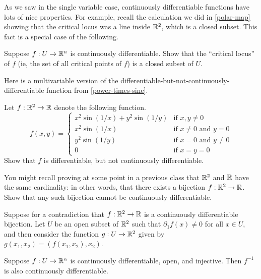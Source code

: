 As we saw in the single variable case, continuously differentiable functions have lots of nice properties. For example, recall the calculation we did in \cref{polar-map} showing that the critical locus was a line inside $\mathbb{R}^2$, which is a closed subset. This fact is a special case of the following.

\begin{exercise} \label{critical-locus-closed}
	Suppose $f : U \to \mathbb{R}^n$ is continuously differentiable. Show that the ``critical locus'' of $f$ (ie, the set of all critical points of $f$) is a closed subset of $U$.
\end{exercise}

Here is a multivariable version of the differentiable-but-not-continuously-differentiable function from \cref{power-times-sine}. 

\begin{exercise}
	Let $f : \mathbb{R}^2 \to \mathbb{R}$ denote the following function.
	\[ f(x, y) = \begin{cases} x^2\sin(1/x) + y^2\sin(1/y) & \text{if } x, y \neq 0 \\
	x^2\sin(1/x) & \text{if } x \neq 0 \text{ and } y = 0 \\
	y^2\sin(1/y) & \text{if } x = 0 \text{ and } y \neq 0 \\
	0 & \text{if } x = y = 0 \end{cases} \]
	Show that $f$ is differentiable, but not continuously differentiable. 
\end{exercise}

\begin{exercise} \label{no-continously-differentiable-bijection}
	You might recall proving at some point in a previous class that $\mathbb{R}^2$ and $\mathbb{R}$ have the same cardinality: in other words, that there exists a bijection $f : \mathbb{R}^2 \to \mathbb{R}$. Show that any such bijection cannot be continuously differentiable. 
	
	\begin{hint}
		Suppose for a contradiction that $f : \mathbb{R}^2 \to \mathbb{R}$ is a continuously differentiable bijection.  Let $U$ be an open subset of $\mathbb{R}^2$ such that $\partial_1 f(x) \neq 0$ for all $x \in U$, and then consider the function $g : U \to \mathbb{R}^2$ given by $g(x_1, x_2) = (f(x_1, x_2), x_2)$. 
	\end{hint}
\end{exercise}

\begin{proposition} \label{c1-stable-inversion}
	Suppose $f : U \to \mathbb{R}^n$ is continuously differentiable, open, and injective. Then $f^{-1}$ is also continuously differentiable. 
\end{proposition} 

